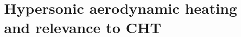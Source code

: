 \section{Hypersonic aerodynamic heating and relevance to CHT}
\label{sec:background:hypersonic-heating-cht}
